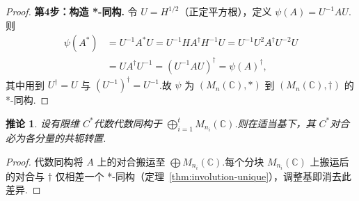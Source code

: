 \documentclass{ctexart}
\newtheorem{corollary}[theorem]{推论}
\theoremstyle{plain}
\newtheorem*{proof}{证明}
\theoremstyle{plain}
\begin{document}
\begin{proof}
\textbf{第4步：构造 *-同构.} 令 $U = H^{1/2}$（正定平方根），定义 $\psi(A) = U^{-1} A U$.则
\begin{align*}
    \psi(A^*) &= U^{-1} A^* U = U^{-1} H A^\dagger H^{-1} U = U^{-1} U^2 A^\dagger U^{-2} U \\
             &= U A^\dagger U^{-1} = (U^{-1} A U)^\dagger = \psi(A)^\dagger,
\end{align*}
其中用到 $U^\dagger = U$ 与 $(U^{-1})^\dagger = U^{-1}$.故 $\psi$ 为 $(M_n(\mathbb{C}), *)$ 到 $(M_n(\mathbb{C}), \dagger)$ 的 *-同构.
\end{proof}

\begin{corollary}\label{cor:direct-sum}
设有限维 $C^*$代数代数同构于 $\bigoplus_{i=1}^t M_{n_i}(\mathbb{C})$.则在适当基下，其 $C^*$对合必为各分量的共轭转置.
\end{corollary}
\begin{proof}
代数同构将 $A$ 上的对合搬运至 $\bigoplus M_{n_i}(\mathbb{C})$.每个分块 $M_{n_i}(\mathbb{C})$ 上搬运后的对合与 $\dagger$ 仅相差一个 *-同构（定理~\ref{thm:involution-unique}），调整基即消去此差异.
\end{proof}
\end{document}

